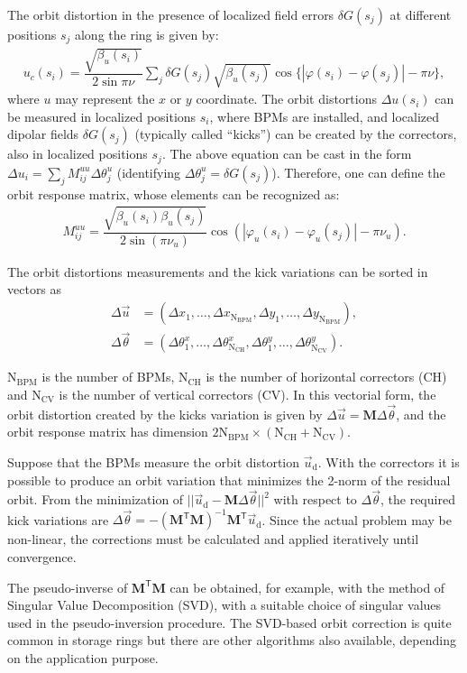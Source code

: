  The orbit distortion in the presence of localized field errors $\delta G(s_j)$ at different positions $s_j$ along the ring is given by:
	\begin{align*}
		u_c(s_i) = \dfrac{\sqrt{\beta_u(s_i)}}{2\sin\pi\nu} \sum_j \delta G({s}_j) \sqrt{\beta_u({s}_j)}\cos\{ |\varphi(s_i) - \varphi({s}_j)| - \pi\nu \},
	\end{align*}
	where $u$ may represent the $x$ or $y$ coordinate.  The orbit distortions $\Delta u(s_i)$ can be measured in localized positions $s_i$, where BPMs are installed, and localized dipolar fields $\delta G(s_j)$ (typically called ``kicks'') can be created by the correctors, also in localized positions $s_j$. The above equation can be cast in the form $\Delta u_i = \sum_{j} M_{ij}^{uu} \Delta \theta_{j}^u$ (identifying $\Delta \theta_{j}^u = \delta G(s_j)$). Therefore, one can define the orbit response matrix, whose elements can be recognized as:
 \begin{align}
 M_{ij}^{uu} = \dfrac{\sqrt{\beta_{u}(s_i)\beta_{u}(s_j)}}{2\sin\left(\pi\nu_{u}\right)}\cos\left( |\varphi_{u}(s_i) - \varphi_{u}(s_j)| - \pi\nu_{u} \right).
 \end{align}

 The orbit distortions measurements and the kick variations can be sorted in vectors as
 \begin{align*}
	 \Delta \vec{u} &= \left(\Delta x_1, \ldots, \Delta x_{\mathrm{N}_{\mathrm{BPM}}}, \Delta y_1, \ldots, \Delta y_{\mathrm{N}_{\mathrm{BPM}}}\right), \\
	 \Delta \vec{\theta} &= \left(\Delta \theta_1^x, \ldots, \Delta \theta_{\mathrm{N}_{\mathrm{CH}}}^x, \Delta \theta_1^y, \ldots, \Delta \theta_{\mathrm{N}_{\mathrm{CV}}}^y\right).
 \end{align*}

 $\mathrm{N}_{\mathrm{BPM}}$ is the number of BPMs, $\mathrm{N}_{\mathrm{CH}}$ is the number of horizontal correctors (CH) and $\mathrm{N}_{\mathrm{CV}}$ is the number of vertical correctors (CV). In this vectorial form, the orbit distortion created by the kicks variation is given by $\Delta \vec{u} = \mathbf{M} \Delta \vec{\theta}$, and the orbit response matrix has dimension $2 \mathrm{N}_{\mathrm{BPM}} \times \left(\mathrm{N}_{\mathrm{CH}} + \mathrm{N}_{\mathrm{CV}}\right)$.

 Suppose that the BPMs measure the orbit distortion $\vec{u}_{\mathrm{d}}$. With the correctors it is possible to produce an orbit variation that minimizes the 2-norm of the residual orbit. From the minimization of $||\vec{u}_{\mathrm{d}} - \mathbf{M}\Delta \vec{\theta}||^2$ with respect to $\Delta\vec{\theta}$, the required kick variations are $\Delta \vec{\theta} = -\left(\mathbf{M}^{\mathsf{T}}\mathbf{M}\right)^{-1}\mathbf{M}^{\mathsf{T}}\vec{u}_{\mathrm{d}}$. Since the actual problem may be non-linear, the corrections must be calculated and applied iteratively until convergence.

 The pseudo-inverse of $\mathbf{M}^{\mathsf{T}}\mathbf{M}$ can be obtained, for example, with the method of Singular Value Decomposition (SVD), with a suitable choice of singular values used in the pseudo-inversion procedure. The SVD-based orbit correction is quite common in storage rings but there are other algorithms also available, depending on the application purpose.
